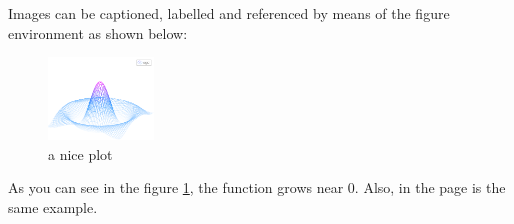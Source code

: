 \documentclass{article}
\begin{document}
Images can be captioned, labelled and referenced by means of the figure environment as shown below:

\begin{figure}[h]
    \centering
    \includegraphics[width=0.25\textwidth]{mesh}
    \caption{a nice plot}
    \label{fig:mesh1}
\end{figure}
 
As you can see in the figure \ref{fig:mesh1}, the 
function grows near 0. Also, in the page \pageref{fig:mesh1} 
is the same example.
\end{document}

